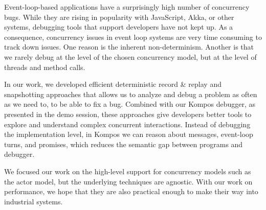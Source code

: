 Event-loop-based applications have a surprisingly high number of concurrency bugs. While they are rising in popularity with JavaScript, Akka, or other systems, debugging tools that support developers have not kept up. As a consequence, concurrency issues in event loop systems are very time consuming to track down issues. One reason is the inherent non-determinism. Another is that we rarely debug at the level of the chosen concurrency model, but at the level of threads and method calls.

In our work, we developed efficient deterministic record \& replay and snapshotting approaches that allows us to analyze and debug a problem as often as we need to, to be able to fix a bug. Combined with our Kompos debugger, as presented in the demo session, these approaches give developers better tools to explore and understand complex concurrent interactions. Instead of debugging the implementation level, in Kompos we can reason about messages, event-loop turns, and promises, which reduces the semantic gap between programs and debugger.

We focused our work on the high-level support for concurrency models such as the actor model, but the underlying techniques are agnostic. With our work on performance, we hope that they are also practical enough to make their way into industrial systems.
